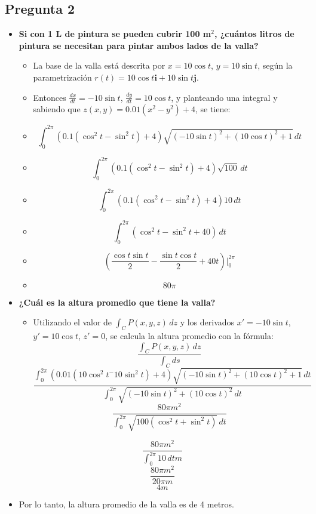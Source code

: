 \documentclass{article}
\begin{document}
\subsection*{Pregunta 2}
\begin{itemize}
    \item \textbf{Si con 1 L de pintura se pueden cubrir 100 m\(^2\), ¿cuántos litros de pintura se necesitan para pintar ambos lados de la valla?}
    \begin{itemize}
        \item La base de la valla está descrita por \( x = 10 \cos t \), \( y = 10 \sin t \), según la parametrización \( r(t) = 10 \cos t \mathbf{i} + 10 \sin t \mathbf{j} \).
        \item Entonces \(\frac{dx}{dt} = -10 \sin t \), \(\frac{dy}{dt} = 10 \cos t \), y planteando una integral y sabiendo que \(z(x, y) = 0.01(x^2 - y^2) + 4\), se tiene:
        \item \to\[ \int_{0}^{2\pi} \left(0.1( \cos^2 t - \sin^2 t) + 4\right) \sqrt{(-10 \sin t)^2 + (10 \cos t)^2 + 1} \, dt \]
        \item \to\[ \int_{0}^{2\pi} \left(0.1( \cos^2 t -  \sin^2 t) + 4\right) \sqrt{100} \, dt \]
        \item \to\[ \int_{0}^{2\pi} \left(0.1( \cos^2 t -  \sin^2 t) + 4\right) 10 \, dt \]
        \item \to\[ \int_{0}^{2\pi} \left( \cos^2 t -  \sin^2 t + 40\right) \, dt \]
        \item \to\[ (\frac{\cos t \sin t}{2} - \frac{\sin t \cos t}{2} + 40t) \Big|_{0}^{2\pi} \]
        \item \to\[ 80\pi \]
        
        
    \end{itemize}
    
    \item \textbf{¿Cuál es la altura promedio que tiene la valla?}
    \begin{itemize}
        \item Utilizando el valor de \( \int_{C} P(x, y, z) \, dz \) y los derivados \( x' = -10 \sin t \), \( y' = 10 \cos t \), \( z' = 0 \), se calcula la altura promedio con la fórmula:
        \[ \frac{\int_{C} P(x, y, z) \, dz}{\int_{C} ds} \] \to \[ \frac{\int_{0}^{2\pi} (0.01 (10 \cos^2 t^ - 10 \sin^2 t)+4) \sqrt{(-10 \sin t)^2 + (10 \cos t)^2 + 1} \, dt}{\int_{0}^{2\pi} \sqrt{(-10 \sin t)^2 + (10 \cos t)^2 } \, dt} \] \to         \[ \frac{80\pi m^2}{\int_{0}^{2\pi} \sqrt{100(\cos^2 t + \sin^2 t)} \, dt} \]   \end{itemize}
        \[ \frac{80\pi m^2}{\int_{0}^{2\pi} 10 \, dt m} \] \to \[ \frac{80\pi m^2}{20\pi m} \] \to \[ 4 m \]
        \item Por lo tanto, la altura promedio de la valla es de 4 metros.
    
    \end{itemize}
\end{document}
